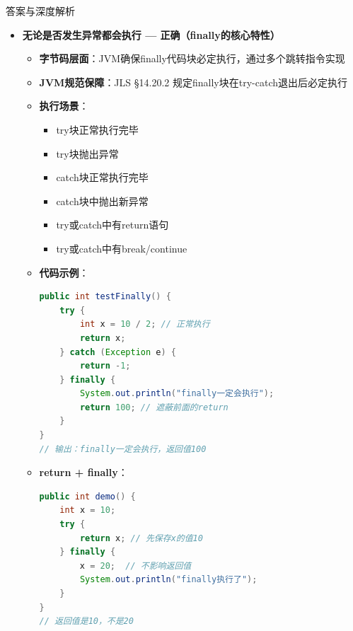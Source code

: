 \documentclass[12pt, a4paper]{ctexart}
\begin{document}
\begin{enumerate}[label=\textbf{\arabic*.}]
\begin{bluebox}{答案与深度解析}
		      \begin{itemize}[leftmargin=*, nosep, label={}]
			      \item[A] \textbf{无论是否发生异常都会执行 — 正确（finally的核心特性）}
			            \begin{itemize}[label={}, leftmargin=*, nosep]
				            \item \textbf{字节码层面}：JVM确保finally代码块必定执行，通过多个跳转指令实现
				            \item \textbf{JVM规范保障}：JLS §14.20.2 规定finally块在try-catch退出后必定执行
				            \item \textbf{执行场景}：
				                  \begin{itemize}[label={}, nosep]
					                  \item try块正常执行完毕
					                  \item try块抛出异常
					                  \item catch块正常执行完毕
					                  \item catch块中抛出新异常
					                  \item try或catch中有return语句
					                  \item try或catch中有break/continue
				                  \end{itemize}
				            \item \textbf{代码示例}：
				                  \begin{lstlisting}[language=Java]
public int testFinally() {
    try {
        int x = 10 / 2; // 正常执行
        return x;
    } catch (Exception e) {
        return -1;
    } finally {
        System.out.println("finally一定会执行");
        return 100; // 遮蔽前面的return
    }
}
// 输出：finally一定会执行，返回值100
				            \end{lstlisting}
				            \item \textbf{return + finally}：
				                  \begin{lstlisting}[language=Java]
public int demo() {
    int x = 10;
    try {
        return x; // 先保存x的值10
    } finally {
        x = 20;  // 不影响返回值
        System.out.println("finally执行了");
    }
}
// 返回值是10，不是20
				            \end{lstlisting}
			            \end{itemize}


\end{itemize}
\end{bluebox}
\end{enumerate}
\end{document}
